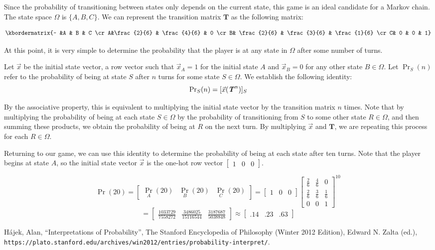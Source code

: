 \documentclass{article}
\newcommand{\T}{\textbf{\textit{T}}}
\newcommand{\x}{\vec{x}}
\begin{document}
	Since the probability of transitioning between states only depends on the current state, this game is an ideal candidate for a Markov chain. The state space $\Omega$ is $\{A, B, C\}$. We can represent the transition matrix $\textbf{T}$ as the following matrix:
	
	\[\kbordermatrix{~ &A & B & C \cr
		A&\frac{2}{6} &  \frac{4}{6}  & 0 \cr
		B& \frac{2}{6}  &  \frac{3}{6} & \frac{1}{6} \cr
		C& 0 & 0 & 1}\]
	
	At this point, it is very simple to determine the probability that the player is at any state in $\Omega$ after some number of turns. 

Let $\x$ be the initial state vector, a row vector such that $\x_A = 1$ for the initial state $A$ and $\x_B = 0$ for any other state $B \in \Omega$. Let $\Pr_S(n)$ refer to the probability of being at state $S$ after $n$ turns for some state $S \in \Omega$. We establish the following identity:
	$${\Pr}_S(n) = [\x (\T^{n})]_S$$
	
	
	By the associative property, this is equivalent to multiplying the initial state vector by the transition matrix $n$ times. Note that by multiplying the probability of being at each state $S \in \Omega$ by the probability of transitioning from $S$ to some other state $R \in \Omega$, and then summing these products, we obtain the probability of being at $R$ on the next turn. By multiplying $\x$ and $\textbf{T}$, we are repeating this process for each $R \in \Omega$.
	
	Returning to our game, we can use this identity to determine the probability of being at each state after ten turns. Note that the player begins at state $A$, so the initial state vector $\x$ is the one-hot row vector $
	[\begin{smallmatrix}
	1 & 0 & 0
	\end{smallmatrix}]
	$.
	
	\[{\Pr}(20) = 
	\begin{bmatrix}
	{\Pr}_{A}(20) & {\Pr}_{B}(20) & {\Pr}_{C}(20)
	\end{bmatrix} =
	\begin{bmatrix}
	1 & 0 & 0
	\end{bmatrix}
	\begin{bmatrix}
		\frac{2}{6} & \frac{4}{6} & 0           \\
		\frac{2}{6} & \frac{3}{6} & \frac{1}{6} \\
		0           & 0			  & 1
	\end{bmatrix}
	^{10}
	\]
	\[
	=	
	\begin{bmatrix}
	\frac{1033729}{7558272} & \frac{3486025}{15116544} & \frac{3187687}{5038848}
	\end{bmatrix}
	\approx \begin{bmatrix}
	.14 & .23 & .63
	\end{bmatrix}
	\]
	
	\begin{thebibliography}{9}
		H\'{a}jek, Alan, ``Interpretations of Probability'', The Stanford Encyclopedia of Philosophy (Winter 2012 Edition), Edward N. Zalta (ed.), \texttt{https://plato.stanford.edu/archives/win2012/entries/probability-interpret/}.
	\end{thebibliography}
\end{document}
